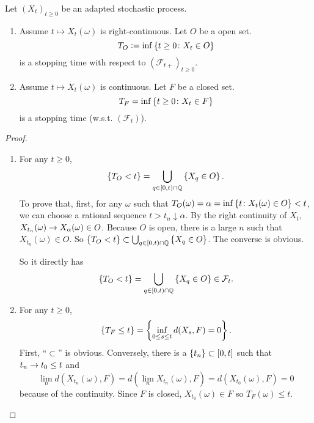 \begin{exam}
    Let $(X_t)_{t \geq 0}$ be an adapted stochastic process. 
    \begin{enumerate}[label=(\arabic{*})]
        \item Assume $t \mapsto X_t(\omega)$ is right-continuous. Let $O$ be a open set.
        \begin{equation*}
            T_O \vcentcolon= \inf \left\{t \geq 0 \colon X_t \in O\right\}
        \end{equation*}
        is a stopping time with respect to $(\mathcal{F}_{t+})_{t \geq 0}$.

        \item Assume $t \mapsto X_t(\omega)$ is continuous. Let $F$ be a closed set.
        \begin{equation*}
            T_F = \inf \left\{t \geq 0 \colon X_t \in F\right\}
        \end{equation*}
        is a stopping time (w.s.t. $(\mathcal{F}_t)$).
    \end{enumerate}
    \begin{proof}
        \begin{enumerate}[label=(\arabic{*})]
            \item For any $t \geq 0$,
            \begin{equation*}
                \left\{T_O < t\right\} = \bigcup_{q \in[0,t)\cap \mathbb{Q}} \left\{X_q \in O\right\}.
            \end{equation*}
            To prove that, first, for any $\omega$ such that $T_O(\omega) = \alpha = \inf\left\{t \colon X_t(\omega) \in O\right\} < t$, we can choose a rational sequence $t > t_n \downarrow \alpha$. By the right continuity of $X_t$, $X_{t_n}(\omega) \rightarrow X_\alpha(\omega) \in O$. Because $O$ is open, there is a large $n$ such that $X_{t_n}(\omega) \in O$. So $\left\{T_O < t\right\} \subset \bigcup_{q \in[0,t)\cap \mathbb{Q}} \left\{X_q \in O\right\}$. The converse is obvious.

            \noindent So it directly has
            \begin{equation*}
                \left\{T_O < t\right\} = \bigcup_{q \in[0,t)\cap \mathbb{Q}} \left\{X_q \in O\right\} \in \mathcal{F}_t.
            \end{equation*}

            \item For any $t \geq 0$,
            \begin{equation*}
                \left\{T_F \leq t\right\} = \left\{\inf_{0 \leq s \leq t} d(X_s,F) = 0\right\}.
            \end{equation*}
            First, ``$\subset$'' is obvious. Conversely, there is a $\left\{t_n\right\} \subset [0,t]$ such that $t_n \rightarrow t_0 \leq t$ and
            \begin{equation*}
                \lim_n d(X_{t_n}(\omega),F) = d(\lim_nX_{t_n}(\omega),F) = d(X_{t_0}(\omega),F) = 0
            \end{equation*}
            because of the continuity. Since $F$ is closed, $X_{t_0}(\omega) \in F$ so $T_F(\omega) \leq t$.


\end{enumerate}
\end{proof}
\end{exam}
